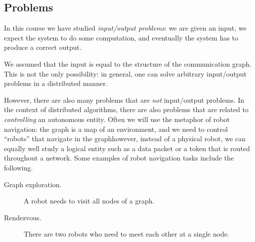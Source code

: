 \subsection{Problems}

In this course we have studied \emph{input/output problems}: we are given an input, we expect the system to do some computation, and eventually the system has to produce a correct output.

We assumed that the input is equal to the structure of the communication graph. This is not the only possibility: in general, one can solve arbitrary input/output problems in a distributed manner.

However, there are also many problems that are \emph{not} input/output problems. In the context of distributed algorithms, there are also problems that are related to \emph{controlling} an autonomous entity. Often we will use the metaphor of robot navigation: the graph is a map of an environment, and we need to control ``robots'' that navigate in the graph\mydash however, instead of a physical robot, we can equally well study a logical entity such as a data packet or a token that is routed throughout a network. Some examples of robot navigation tasks include the following.
\begin{description}
    \item[Graph exploration.] A robot needs to visit all nodes of a graph.
    \item[Rendezvous.] There are two robots who need to meet each other at a single node.
\end{description}


